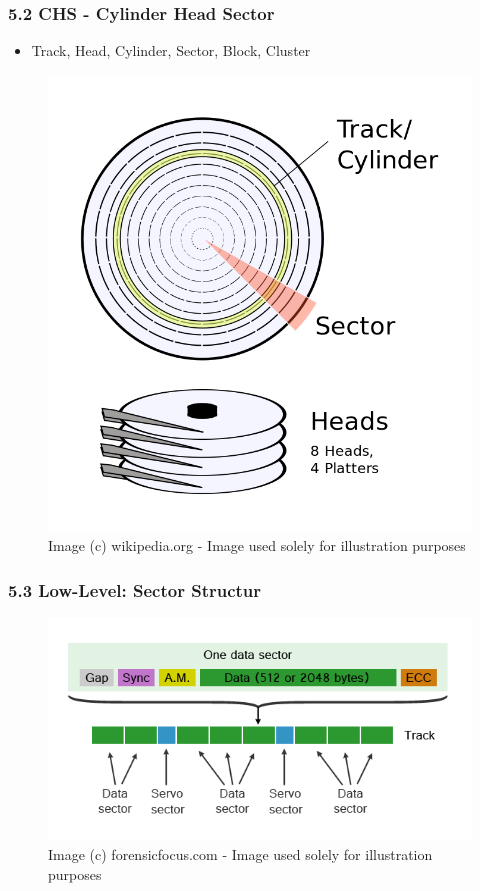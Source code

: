 \begin{frame}
  \frametitle{5.2 CHS - Cylinder Head Sector}
    \begin{itemize}
        \item[] Track, Head, Cylinder, Sector, Block, Cluster
    \end{itemize}
    \begin{figure}
        \includegraphics[scale=0.2]{images/chs.png}
        \captionsetup{labelformat=empty,labelsep=none}
        \caption[]{\tiny Image (c) wikipedia.org - Image used solely for illustration purposes}
    \end{figure}
\end{frame}


\begin{frame}[fragile]
  \frametitle{5.3 Low-Level: Sector Structur}
    \begin{figure}
        \includegraphics[scale=0.5]{images/sector.png}
        \captionsetup{labelformat=empty,labelsep=none}
        \caption[]{\tiny Image (c) forensicfocus.com - Image used solely for illustration purposes}
    \end{figure}
\end{frame}


